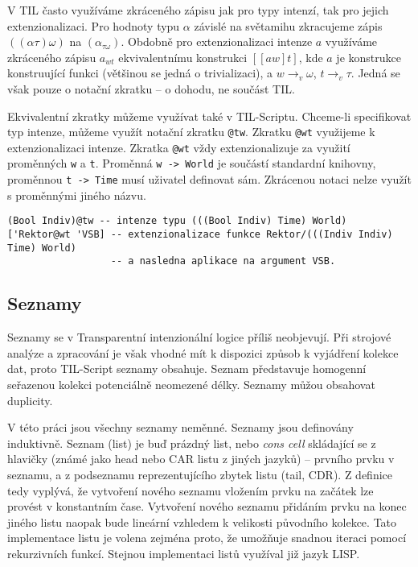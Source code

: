 V TIL často využíváme zkráceného zápisu jak pro typy intenzí, tak pro jejich extenzionalizaci.
Pro hodnoty typu $\alpha$ závislé na světamihu zkracujeme zápis $((\alpha\tau)\omega)$
na $(\alpha_{\tau\omega})$. Obdobně pro extenzionalizaci intenze $a$ využíváme zkráceného zápisu
$a_{wt}$ ekvivalentnímu konstrukci $[[a w] t]$, kde $a$ je konstrukce konstruující funkci
(většinou se jedná o trivializaci), a $w \rightarrow_v \omega$, $t \rightarrow_v \tau$. Jedná
se však pouze o notační zkratku -- o dohodu, ne součást TIL.

Ekvivalentní zkratky můžeme využívat také v TIL-Scriptu. Chceme-li specifikovat typ intenze, můžeme
využít notační zkratku \lstinline{@tw}. Zkratku \lstinline{@wt} využijeme k extenzionalizaci
intenze. Zkratka \lstinline{@wt} vždy extenzionalizuje za využití proměnných \lstinline{w} a
\lstinline{t}. Proměnná \lstinline{w -> World} je součástí standardní knihovny, proměnnou
\lstinline{t -> Time} musí uživatel definovat sám. Zkrácenou notaci nelze využít s proměnnými
jiného názvu.

\begin{lstlisting}[caption={Příklad využití zkrácené notace}]
(Bool Indiv)@tw -- intenze typu (((Bool Indiv) Time) World)
['Rektor@wt 'VSB] -- extenzionalizace funkce Rektor/(((Indiv Indiv) Time) World)
                  -- a nasledna aplikace na argument VSB.
\end{lstlisting}

\subsection{Seznamy}

Seznamy se v Transparentní intenzionální logice příliš neobjevují. Při strojové analýze a
zpracování je však vhodné mít k dispozici způsob k vyjádření kolekce dat, proto TIL-Script seznamy
obsahuje. Seznam představuje homogenní seřazenou kolekci potenciálně neomezené délky. Seznamy můžou
obsahovat duplicity.

V této práci jsou všechny seznamy neměnné. Seznamy jsou definovány induktivně. Seznam (list) je buď
prázdný list, nebo \textit{cons cell} skládající se z hlavičky (známé jako head nebo CAR listu
z jiných jazyků) -- prvního prvku v seznamu, a z podseznamu reprezentujícího zbytek listu
(tail, CDR). Z definice tedy vyplývá, že vytvoření nového seznamu vložením prvku na začátek lze
provést v konstantním čase. Vytvoření nového seznamu přidáním prvku na konec jiného listu naopak
bude lineární vzhledem k velikosti původního kolekce. Tato implementace listu je volena zejména
proto, že umožňuje snadnou iteraci pomocí rekurzivních funkcí. Stejnou implementaci listů využíval
již jazyk LISP.

